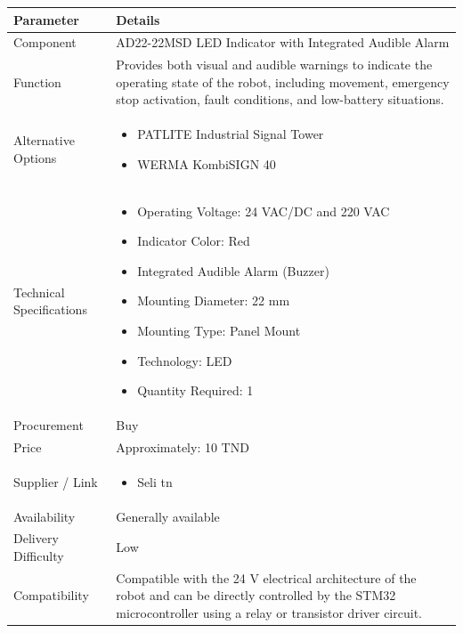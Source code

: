 \documentclass[12pt,a4paper]{article}
\begin{document}
\begin{longtable}{|p{4cm}|p{10cm}|}
\hline

\textbf{Parameter} & \textbf{Details} \\
\hline

Component &
AD22-22MSD LED Indicator with Integrated Audible Alarm \\
\hline

Function &
Provides both visual and audible warnings to indicate the operating state of the robot, including movement, emergency stop activation, fault conditions, and low-battery situations. \\
\hline


Alternative Options &
\begin{itemize}
\item PATLITE Industrial Signal Tower
\item WERMA KombiSIGN 40
\end{itemize}
\\
\hline

Technical Specifications &
\begin{itemize}
\item Operating Voltage: 24 VAC/DC and 220 VAC 
\item Indicator Color: Red 
\item Integrated Audible Alarm (Buzzer) 
\item Mounting Diameter: 22 mm 
\item Mounting Type: Panel Mount 
\item Technology: LED 
\item Quantity Required: 1
\end{itemize}
\\
\hline

Procurement &
Buy \\
\hline

Price &
Approximately:  10 TND
\\
\hline

Supplier / Link &
\begin{itemize}
\item Seli tn

\end{itemize}
\\
\hline

Availability &
Generally available \\
\hline

Delivery Difficulty &
Low \\
\hline

Compatibility &
Compatible with the 24 V electrical architecture of the robot and can be directly controlled by the STM32 microcontroller using a relay or transistor driver circuit. \\ 
\hline 


\end{longtable}
\end{document}
